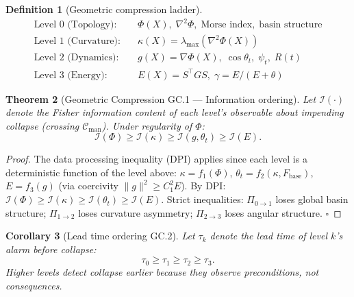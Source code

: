 \documentclass[11pt,a4paper]{article}
\newtheorem{theorem}{Theorem}[section]
\newtheorem{corollary}[theorem]{Corollary}
\theoremstyle{definition}
\newtheorem{definition}[theorem]{Definition}
\newcommand{\Fbase}{F_{\mathrm{base}}}
\begin{document}
\begin{definition}[Geometric compression ladder]
\begin{align*}
\text{Level~0 (Topology):}&\quad \Phi(X),\;\nabla^2\Phi,\;\text{Morse index},\;\text{basin structure}\\
\text{Level~1 (Curvature):}&\quad \kappa(X) = \lambda_\mathrm{max}(\nabla^2\Phi(X))\\
\text{Level~2 (Dynamics):}&\quad g(X)=\nabla\Phi(X),\;\cos\theta_t,\;\psi_t,\;R(t)\\
\text{Level~3 (Energy):}&\quad E(X)=S^\top GS,\;\gamma=E/(E+\theta)
\end{align*}
\end{definition}

\begin{theorem}[Geometric Compression GC.1 --- Information ordering]
Let $\mathcal{I}(\cdot)$ denote the Fisher information content of each level's
observable about impending collapse (crossing $\mathcal{C}_\mathrm{man}$).
Under regularity of $\Phi$:
\[
\mathcal{I}(\Phi) \geq \mathcal{I}(\kappa) \geq \mathcal{I}(g,\theta_t) \geq \mathcal{I}(E).
\]
\end{theorem}

\begin{proof}
The data processing inequality (DPI) applies since each level is a
deterministic function of the level above: $\kappa = f_1(\Phi)$,
$\theta_t = f_2(\kappa, \Fbase)$, $E = f_3(g)$ (via coercivity
$\|g\|^2 \geq C_1^2 E$).
By DPI: $\mathcal{I}(\Phi)\geq\mathcal{I}(\kappa)\geq\mathcal{I}(\theta_t)\geq\mathcal{I}(E)$.
Strict inequalities: $\Pi_{0\to1}$ loses global basin structure;
$\Pi_{1\to2}$ loses curvature asymmetry; $\Pi_{2\to3}$ loses angular structure.
$\square$
\end{proof}

\begin{corollary}[Lead time ordering GC.2]
Let $\tau_k$ denote the lead time of level $k$'s alarm before collapse:
\[
\tau_0 \geq \tau_1 \geq \tau_2 \geq \tau_3.
\]
Higher levels detect collapse earlier because they observe preconditions,
not consequences.
\end{corollary}
\end{document}
